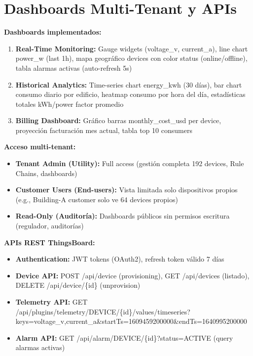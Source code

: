 \section{Dashboards Multi-Tenant y APIs}
\label{sec:server-dashboards-apis}

\textbf{Dashboards implementados:}

\begin{enumerate}
    \item \textbf{Real-Time Monitoring:} Gauge widgets (voltage\_v, current\_a), line chart power\_w (last 1h), mapa geográfico devices con color status (online/offline), tabla alarmas activas (auto-refresh 5s)~\cite{huangRealTimeMonitoring2025}
    \item \textbf{Historical Analytics:} Time-series chart energy\_kwh (30 días), bar chart consumo diario por edificio, heatmap consumo por hora del día, estadísticas totales kWh/power factor promedio
    \item \textbf{Billing Dashboard:} Gráfico barras monthly\_cost\_usd per device, proyección facturación mes actual, tabla top 10 consumers
\end{enumerate}

\textbf{Acceso multi-tenant:}

\begin{itemize}
    \item \textbf{Tenant Admin (Utility):} Full access (gestión completa 192 devices, Rule Chains, dashboards)
    \item \textbf{Customer Users (End-users):} Vista limitada solo dispositivos propios (e.g., Building-A customer solo ve 64 devices propios)
    \item \textbf{Read-Only (Auditoría):} Dashboards públicos sin permisos escritura (regulador, auditorías)
\end{itemize}

\textbf{APIs REST ThingsBoard:}

\begin{itemize}
    \item \textbf{Authentication:} JWT tokens (OAuth2), refresh token válido 7 días
    \item \textbf{Device API:} POST /api/device (provisioning), GET /api/devices (listado), DELETE /api/device/\{id\} (unprovision)
    \item \textbf{Telemetry API:} GET /api/plugins/telemetry/DEVICE/\{id\}/values/timeseries?keys=voltage\_v,current\_a\&startTs=1609459200000\&endTs=1640995200000
    \item \textbf{Alarm API:} GET /api/alarm/DEVICE/\{id\}?status=ACTIVE (query alarmas activas)
\end{itemize}

